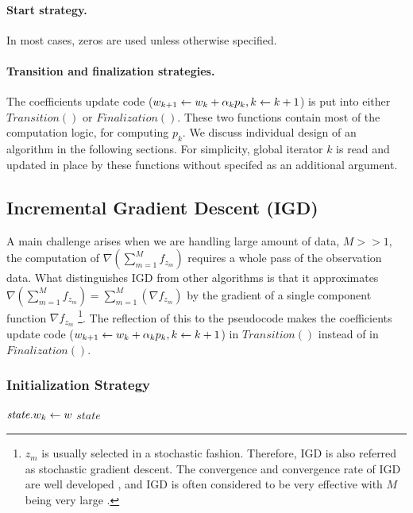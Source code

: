 \paragraph{Start strategy.}
In most cases, zeros are used unless otherwise specified.

\paragraph{Transition and finalization strategies.}
The coefficients update code ($w_{k+1} \leftarrow w_k + \alpha_k p_k, k \leftarrow k + 1$) is put into either $\mathit{Transition}()$ or $\mathit{Finalization}()$.
These two functions contain most of the computation logic, for computing $p_k$.
We discuss individual design of an algorithm in the following sections.
For simplicity, global iterator $k$ is read and updated in place by these functions without specifed as an additional argument.

\subsection{Incremental Gradient Descent (IGD)}
A main challenge arises when we are handling large amount of data, $M >> 1,$ the computation of $\nabla (\sum_{m=1}^M f_{z_m})$ requires a whole pass of the observation data.
What distinguishes IGD from other algorithms is that it approximates  $\nabla (\sum_{m=1}^M f_{z_m}) = \sum_{m=1}^M (\nabla f_{z_m})$ by the gradient of a single component function $\nabla f_{z_m}$
\footnote{$z_m$ is usually selected in a stochastic fashion.
Therefore, IGD is also referred as stochastic gradient descent.
The convergence and convergence rate of IGD are well developed \cite{springerlink:10.1007/s10107-011-0472-0}, and IGD is often considered to be very effective with $M$ being very large \cite{DBLP:conf/nips/BottouB07}.}.
The reflection of this to the pseudocode makes the coefficients update code ($w_{k+1} \leftarrow w_k + \alpha_k p_k, k \leftarrow k + 1$) in $\mathit{Transition}()$ instead of in $\mathit{Finalization}()$.

\subsubsection{Initialization Strategy}
\begin{algorithm} \label{alg:initialization-igd}
\begin{algorithmic}[1]
    \State $\mathit{state}.w_k \leftarrow w$
    \State \Return $\mathit{state}$
\end{algorithmic}
\end{algorithm}

